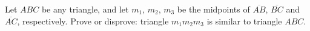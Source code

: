 Let $ABC$ be any triangle, and let $m_1$, $m_2$, $m_3$ be the midpoints of $\overline{AB}$, $\overline{BC}$ and $\overline{AC}$, respectively. Prove or disprove: triangle $m_1m_2m_3$ is similar to triangle $ABC$.
